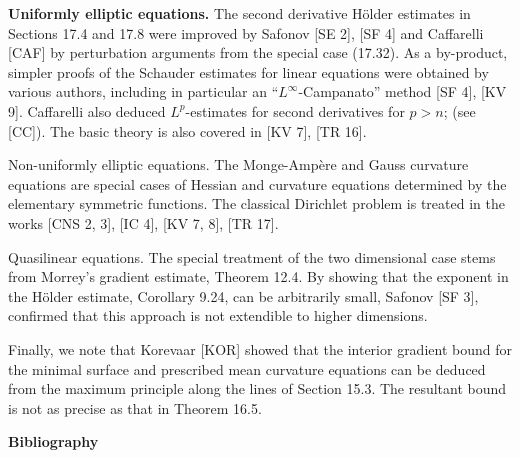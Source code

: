 \noindent \textbf{Uniformly elliptic equations.} The second derivative H\"older estimates in Sections 17.4 and 17.8 were improved by Safonov [SE 2], [SF 4] and Caffarelli [CAF] by perturbation arguments from the special case (17.32). As a by-product, simpler proofs of the Schauder estimates for linear equations were obtained by various authors, including in particular an ``$L^\infty$-Campanato'' method [SF 4], [KV 9]. Caffarelli also deduced $L^p$-estimates for second derivatives for $p>n$; (see [CC]). The basic theory is also covered in [KV 7], [TR 16].



Non-uniformly elliptic equations. The Monge-Ampère and Gauss curvature equations are special cases of Hessian and curvature equations determined by the elementary symmetric functions. The classical Dirichlet problem is treated in the works [CNS 2, 3], [IC 4], [KV 7, 8], [TR 17].

Quasilinear equations. The special treatment of the two dimensional case stems from Morrey's gradient estimate, Theorem 12.4. By showing that the exponent in the Hölder estimate, Corollary 9.24, can be arbitrarily small, Safonov [SF 3], confirmed that this approach is not extendible to higher dimensions.

Finally, we note that Korevaar [KOR] showed that the interior gradient bound for the minimal surface and prescribed mean curvature equations can be deduced from the maximum principle along the lines of Section 15.3. The resultant bound is not as precise as that in Theorem 16.5.

\bigskip

\textbf{Bibliography}

